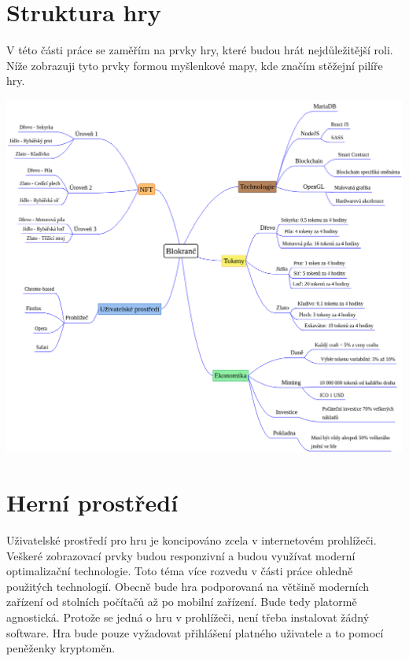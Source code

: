 \documentclass{article}
\begin{document}
\begin{spacing}{1.15}
		\section*{Struktura hry}
		V této části práce se zaměřím na prvky hry, které budou hrát
        nejdůležitější roli. Níže zobrazuji tyto prvky formou myšlenkové mapy,
        kde značím stěžejní pilíře hry.
		
		\begin{center}
			\label{Myšlenková mapa}
			\includegraphics[scale=0.5]{221104-NPH-Blokranč.png}
		\end{center}
		
		\section*{Herní prostředí}
        Uživatelské prostředí pro hru je koncipováno zcela v internetovém
        prohlížeči. Veškeré zobrazovací prvky budou responzivní a budou využívat
        moderní optimalizační technologie. Toto téma více rozvedu v části práce
        ohledně použitých technologií. Obecně bude hra podporovaná na většině
        moderních zařízení od stolních počítačů až po mobilní zařízení. Bude
        tedy platormě agnostická. Protože se jedná o hru v prohlížeči, není
        třeba instalovat žádný software. Hra bude pouze vyžadovat přihlášení
        platného uživatele a to pomocí peněženky kryptoměn.
        

\end{spacing}
\end{document}
